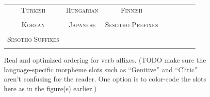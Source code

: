 \documentclass[11pt,letterpaper]{article}
\newcommand\mhahn[1]{{\color{red}(#1)}}
\begin{document}
\begin{figure}[]

\begin{tabular}{cccccccc}
\textsc{Turkish} & \textsc{Hungarian} & \textsc{Finnish} \\
\begin{minipage}{.3\textwidth}
  
  \end{minipage}
  &
  \begin{minipage}{.3\textwidth}
  
  \end{minipage}
  &
    \begin{minipage}{.3\textwidth}
  
  \end{minipage}
  \\
  \textsc{Korean}  & \textsc{Japanese} & \textsc{Sesotho Prefixes} \\
      \begin{minipage}{.3\textwidth}
  
  \end{minipage}
  &
  \begin{minipage}{.3\textwidth}
  
  \end{minipage}
  &
  \begin{minipage}{.3\textwidth}
  
  \end{minipage} \\
  \textsc{Sesotho Suffixes} \\
  \begin{minipage}{.3\textwidth}
  
  \end{minipage}
  \end{tabular}
  
  
    \caption{Real and optimized ordering for verb affixes. \mhahn{TODO make sure the language-specific morpheme slots such as ``Genitive'' and ``Clitic'' aren't confusing for the reader. One option is to color-code the slots here as in the figure(s) earlier.}}
    \label{fig:real_and_optimized_verbs}
\end{figure}
\end{document}

